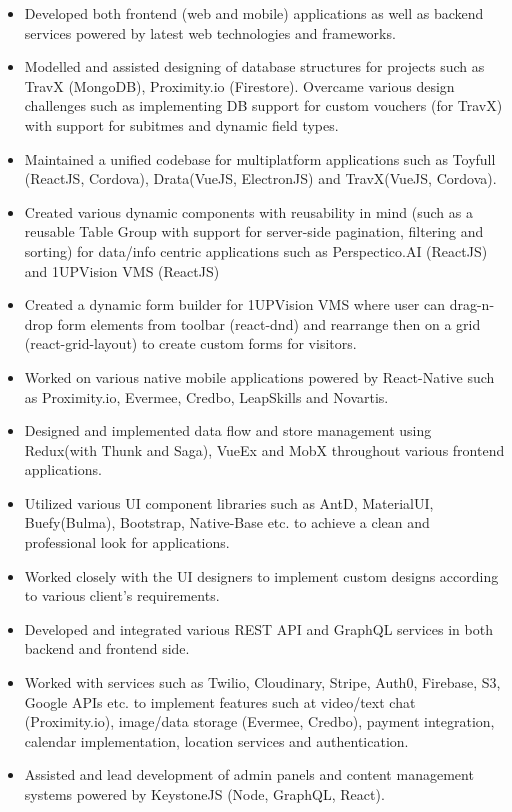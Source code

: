 \documentclass[10pt,a4paper,ragged2e]{maltacv}
\begin{document}
\begin{itemize}
  \item Developed both frontend (web and mobile) applications as well as backend services powered by latest web technologies and frameworks.
  \item Modelled and assisted designing of database structures for projects such as TravX (MongoDB), Proximity.io (Firestore). Overcame various design challenges such as implementing DB support for custom vouchers (for TravX) with support for subitmes and dynamic field types. 
  \item Maintained a unified codebase for multiplatform applications such as Toyfull (ReactJS, Cordova), Drata(VueJS, ElectronJS) and TravX(VueJS, Cordova).
  \item Created various dynamic components with reusability in mind (such as a reusable Table Group with support for server-side pagination, filtering and sorting) for data/info centric applications such as Perspectico.AI (ReactJS) and 1UPVision VMS (ReactJS)
  \item Created a dynamic form builder for 1UPVision VMS where user can drag-n-drop form elements from toolbar (react-dnd) and rearrange then on a grid (react-grid-layout) to create custom forms for visitors.
  \item Worked on various native mobile applications powered by React-Native such as Proximity.io, Evermee, Credbo, LeapSkills and Novartis. 
  \item Designed and implemented data flow and store management using Redux(with Thunk and Saga), VueEx and MobX throughout various frontend applications.
  \item Utilized various UI component libraries such as AntD, MaterialUI, Buefy(Bulma), Bootstrap, Native-Base etc. to achieve a clean and professional look for applications. 
  \item Worked closely with the UI designers to implement custom designs according to various client's requirements.
  \item Developed and integrated various REST API and GraphQL services in both backend and frontend side.
  \item Worked with services such as Twilio, Cloudinary, Stripe, Auth0, Firebase, S3, Google APIs etc. to implement features such at video/text chat (Proximity.io), image/data storage (Evermee, Credbo), payment integration, calendar implementation, location services and authentication.  
  \item Assisted and lead development of admin panels and content management systems powered by KeystoneJS (Node, GraphQL, React).
\end{itemize}
\end{document}
